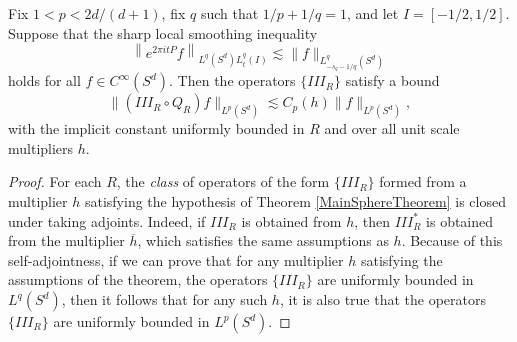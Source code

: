 \begin{lemma} \label{LocalSmoothingLargeTimesTheorem}
    Fix $1 < p < 2d/(d+1)$, fix $q$ such that $1/p + 1/q = 1$, and let $I = [-1/2, 1/2]$. Suppose that the sharp local smoothing inequality
    \[ \left\| e^{2 \pi i t P} f \right\|_{L^q(S^d) L^q_t(I)} \lesssim \| f \|_{L^q_{-s_q-1/q}(S^d)} \]
    holds for all $f \in C^\infty(S^d)$. Then the operators $\{ III_R \}$ satisfy a bound
    \[ \| (III_R \circ Q_R) f \|_{L^p(S^d)} \lesssim C_p(h) \| f \|_{L^p(S^d)}, \]
    with the implicit constant uniformly bounded in $R$ and over all unit scale multipliers $h$.
\end{lemma}
\begin{proof}
    For each $R$, the \emph{class} of operators of the form $\{ III_R \}$ formed from a multiplier $h$ satisfying the hypothesis of Theorem \ref{MainSphereTheorem} is closed under taking adjoints. Indeed, if $III_R$ is obtained from $h$, then $III_R^*$ is obtained from the multiplier $\overline{h}$, which satisfies the same assumptions as $h$. Because of this self-adjointness, if we can prove that for any multiplier $h$ satisfying the assumptions of the theorem, the operators $\{ III_R \}$ are uniformly bounded in $L^q(S^d)$, then it follows that for any such $h$, it is also true that the operators $\{ III_R \}$ are uniformly bounded in $L^p(S^d)$.


\end{proof}
